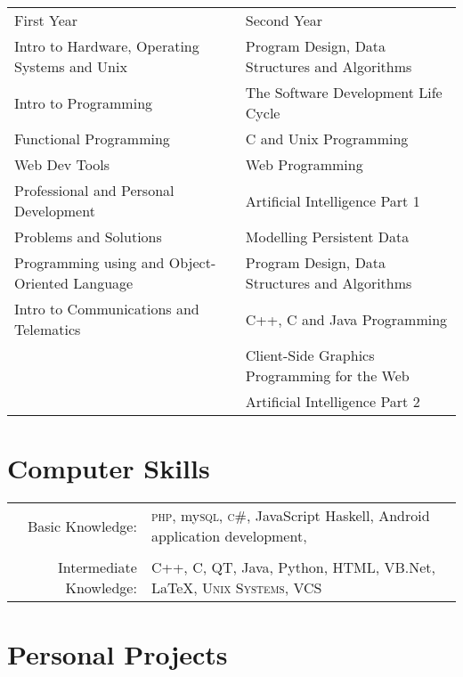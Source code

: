 \documentclass[a4paper,10pt]{article}
\begin{document}
\begin{tabular}{l|l}
First Year & Second Year 
\\
\footnotesize{}Intro to Hardware, Operating Systems and Unix & \footnotesize{}Program Design, Data Structures and Algorithms 
\\
\footnotesize{}Intro to Programming & \footnotesize{}The Software Development Life Cycle
\\
\footnotesize{}Functional Programming & \footnotesize{}C and Unix Programming
\\
\footnotesize{}Web Dev Tools &\footnotesize{}Web Programming 
\\
\footnotesize{}Professional and Personal Development & \footnotesize{}Artificial Intelligence Part 1
\\
\footnotesize{}Problems and Solutions & \footnotesize{}Modelling Persistent Data
\\
\footnotesize{}Programming using and Object-Oriented Language  & \footnotesize{}Program Design, Data Structures and Algorithms
\\
\footnotesize{}Intro to Communications and Telematics & \footnotesize{}C++, C and Java Programming
\\
& \footnotesize{}Client-Side Graphics Programming for the Web 
\\
& \footnotesize{}Artificial Intelligence Part 2 



\end{tabular}

\section{Computer Skills}
\begin{tabular}{rl}
 Basic Knowledge:& \textsc{php}, my\textsc{sql}, \textsc{c\#}, JavaScript Haskell, Android application development,  \\
 \setmainfont[SmallCapsFont=Fontin-SmallCaps.otf]{Fontin.otf}\\
Intermediate Knowledge:& C++, C, QT, Java, Python, HTML, VB.Net, \LaTeX, \textsc{Unix Systems}, VCS
\end{tabular}
\par 
 
\section{Personal Projects }
\end{document}
